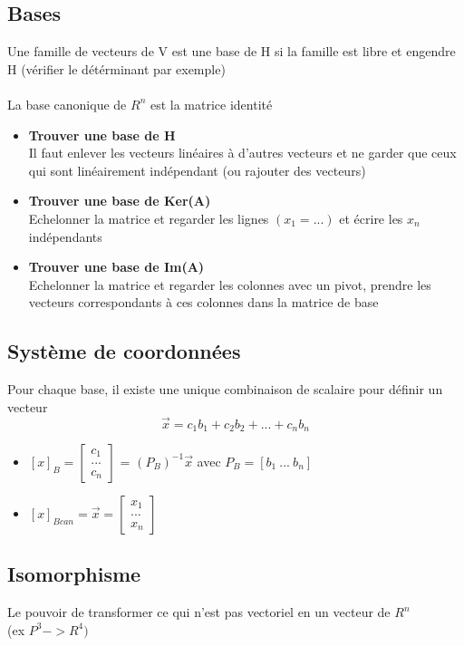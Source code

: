 \documentclass{article}
\begin{document}
\subsection{Bases}
Une famille de vecteurs de V est une base de H si la famille est libre et engendre H (vérifier le détérminant par exemple) \\\\
La base canonique de $R^n$ est la matrice identité
\begin{itemize}
    \item \textbf{Trouver une base de H} \\
Il faut enlever les vecteurs linéaires à d'autres vecteurs et ne garder que ceux qui sont linéairement indépendant (ou rajouter des vecteurs)
    \item \textbf{Trouver une base de Ker(A)} \\
    Echelonner la matrice et regarder les lignes $(x_1 = ...)$ et écrire les $x_n$ indépendants
    \item \textbf{Trouver une base de Im(A)} \\
    Echelonner la matrice et regarder les colonnes avec un pivot, prendre les vecteurs correspondants à ces colonnes dans la matrice de base
\end{itemize}
\subsection{Système de coordonnées}
Pour chaque base, il existe une unique combinaison de scalaire pour définir un vecteur
\[ \overrightarrow{x} = c_1b_1 + c_2b_2 + ... + c_nb_n \]
\begin{itemize}
    \item $[x]_{B} = \begin{bmatrix}
        c_1 \\
        ... \\
        c_n
    \end{bmatrix}$ = $(P_B)^{-1} \overrightarrow{x}$ \qquad avec $P_B = [b_1\ ...\ b_n]$
    \item $[x]_{Bcan} = \overrightarrow{x} = \begin{bmatrix}
        x_1\\
        ... \\
        x_n
    \end{bmatrix}$
\end{itemize}
\subsection{Isomorphisme}
Le pouvoir de transformer ce qui n'est pas vectoriel en un vecteur de $R^n$\\ (ex $P^3 -> R^4)$
\end{document}
